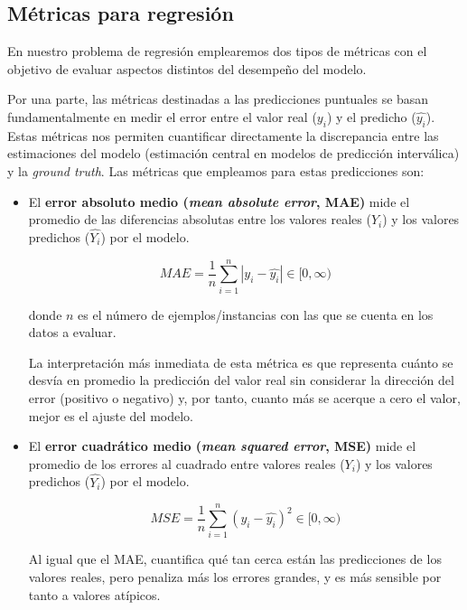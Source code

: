 

\subsection{Métricas para regresión}

En nuestro problema de regresión emplearemos dos tipos de métricas con el objetivo de evaluar aspectos distintos del desempeño del modelo.

Por una parte, las métricas destinadas a las predicciones puntuales se basan fundamentalmente en medir el error entre el valor real ($y_i$) y el predicho ($\hat{y_i}$). Estas métricas nos permiten cuantificar directamente la discrepancia entre las estimaciones del modelo (estimación central en modelos de predicción interválica) y la \textit{ground truth}. Las métricas que empleamos para estas predicciones son:

\begin{itemize}
    \item El \textbf{error absoluto medio (\textit{mean absolute error}, MAE)} mide el promedio de las diferencias absolutas entre los valores reales ($Y_i$) y los valores predichos ($\hat{Y_i}$) por el modelo.

    $$
    MAE = \frac{1}{n} \sum_{i=1}^n{|y_i - \hat{y_i}|} \in [0, \infty)
    $$

    donde $n$ es el número de ejemplos/instancias con las que se cuenta en los datos a evaluar.

    La interpretación más inmediata de esta métrica es que representa cuánto se desvía en promedio la predicción del valor real sin considerar la dirección del error (positivo o negativo) y, por tanto, cuanto más se acerque a cero el valor, mejor es el ajuste del modelo.

    \item El \textbf{error cuadrático medio (\textit{mean squared error}, MSE)} mide el promedio de los errores al cuadrado entre valores reales ($Y_i$) y los valores predichos ($\hat{Y_i}$) por el modelo.
    
    $$
    MSE = \frac{1}{n} \sum_{i=1}^n{(y_i - \hat{y_i})^2} \in [0, \infty)
    $$

    Al igual que el MAE, cuantifica qué tan cerca están las predicciones de los valores reales, pero penaliza más los errores grandes, y es más sensible por tanto a valores atípicos.

\end{itemize}


